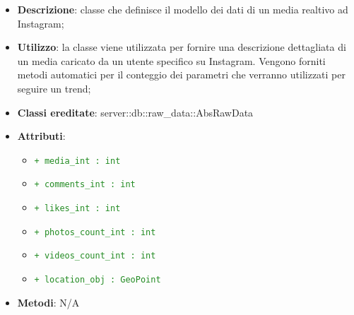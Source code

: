 			\begin{itemize}
				\item \textbf{Descrizione}: classe che definisce il modello dei dati di un media realtivo ad Instagram;
				\item \textbf{Utilizzo}: la classe viene utilizzata per fornire una descrizione dettagliata di un media caricato da un utente specifico su Instagram. Vengono forniti metodi automatici per il conteggio dei parametri che verranno utilizzati per seguire un trend;
				\item \textbf{Classi ereditate}: server::db::raw\_data::AbsRawData
				\item \textbf{Attributi}:
					\begin{itemize}
						\item \textcolor{forestgreen}{\texttt{+ media\_int : int}}
						\item \textcolor{forestgreen}{\texttt{+ comments\_int : int}}
						\item \textcolor{forestgreen}{\texttt{+ likes\_int : int}}
						\item \textcolor{forestgreen}{\texttt{+ photos\_count\_int : int}}
						\item \textcolor{forestgreen}{\texttt{+ videos\_count\_int : int}}
						\item \textcolor{forestgreen}{\texttt{+ location\_obj : GeoPoint}}
					\end{itemize}
				\item \textbf{Metodi}: N/A
			\end{itemize}

